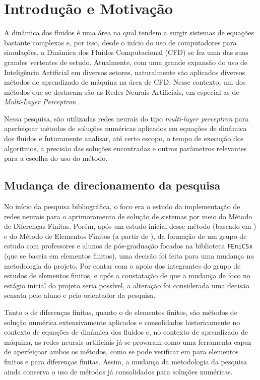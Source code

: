 \section{Introdução e Motivação}

A dinâmica dos fluidos é uma área na qual tendem a surgir sistemas de equações bastante complexas e, por isso, desde o início do uso de computadores para simulações, a Dinâmica dos Fluidos Computacional (CFD) se fez uma das suas grandes vertentes de estudo.
Atualmente, com uma grande expansão do uso de Inteligência Artificial em diversos setores, naturalmente são aplicados diversos métodos de aprendizado de máquina na área de CFD. Nesse contexto, um dos métodos que se destacam são as Redes Neurais Artificiais, em especial as de \textit{Multi-Layer Perceptron} \cite{Sharma2023-fr}.

Nessa pesquisa, são utilizadas redes neurais do tipo \textit{multi-layer perceptron} para aperfeiçoar métodos de soluções numéricas aplicados em equações de dinâmica dos fluidos e futuramente analisar, até certo escopo, o tempo de execução dos algoritmos, a precisão das soluções encontradas e outros parâmetros relevantes para a escolha do uso do método.

\subsection{Mudança de direcionamento da pesquisa}

No início da pesquisa bibliográfica, o foco era o estudo da implementação de redes neurais para o aprimoramento de solução de sistemas por meio do Método de Diferenças Finitas.
Porém, após um estudo inicial desse método (baseado em ) e do Método de Elementos Finitos (a partir de ), da formação de um grupo de estudo com professores e alunos de pós-graduação focados na biblioteca \texttt{FEniCSx} (que se baseia em elementos finitos), uma decisão foi feita para uma mudança na metodologia do projeto.
Por contar com o apoio dos integrantes do grupo de estudos de elementos finitos, e após a constatação de que a mudança de foco no estágio inicial do projeto seria possível, a alteração foi considerada uma decisão sensata pelo aluno e pelo orientador da pesquisa.

Tanto o de diferenças finitas, quanto o de elementos finitos, são métodos de solução numérica extensivamente aplicados e consolidados historicamente no contexto de equações de dinâmica dos fluidos \cite{Thomee1984-sc} e, no contexto de aprendizado de máquina, as redes neurais artificiais já se provaram como uma ferramenta capaz de aperfeiçoar ambos os métodos, como se pode verificar em  para elementos finitos e  para diferenças finitas.
Assim, a mudança da metodologia da pesquisa ainda conserva o uso de métodos já consolidados para soluções numéricas.